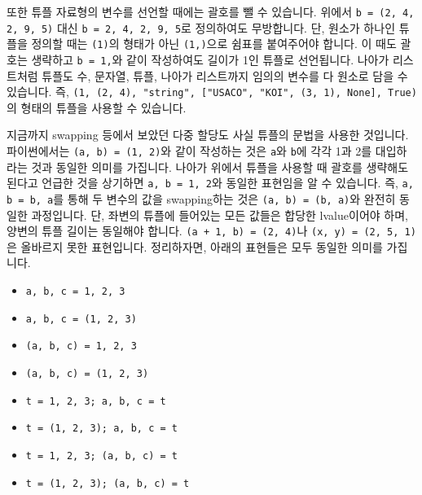 \documentclass[../main.tex]{subfiles}
\begin{document}
또한 튜플 자료형의 변수를 선언할 때에는 괄호를 뺄 수 있습니다.
위에서 \texttt{b = (2, 4, 2, 9, 5)} 대신 \texttt{b = 2, 4, 2, 9, 5}로 정의하여도 무방합니다.
단, 원소가 하나인 튜플을 정의할 때는 \texttt{(1)}의 형태가 아닌 \texttt{(1,)}으로 쉼표를 붙여주어야 합니다.
이 때도 괄호는 생략하고 \texttt{b = 1,}와 같이 작성하여도 길이가 1인 튜플로 선언됩니다.
나아가 리스트처럼 튜플도 수, 문자열, 튜플, 나아가 리스트까지 임의의 변수를 다 원소로 담을 수 있습니다.
즉, \texttt{(1, (2, 4), "string", ["USACO", "KOI", (3, 1), None], True)}의 형태의 튜플을 사용할 수 있습니다.

지금까지 swapping 등에서 보았던 다중 할당도 사실 튜플의 문법을 사용한 것입니다.
파이썬에서는 \texttt{(a, b) = (1, 2)}와 같이 작성하는 것은 \texttt{a}와 \texttt{b}에 각각 1과 2를 대입하라는 것과 동일한 의미를 가집니다.
나아가 위에서 튜플을 사용할 때 괄호를 생략해도 된다고 언급한 것을 상기하면 \texttt{a, b = 1, 2}와 동일한 표현임을 알 수 있습니다.
즉, \texttt{a, b = b, a}를 통해 두 변수의 값을 swapping하는 것은 \texttt{(a, b) = (b, a)}와 완전히 동일한 과정입니다.
단, 좌변의 튜플에 들어있는 모든 값들은 합당한 lvalue이어야 하며, 양변의 튜플 길이는 동일해야 합니다.
\texttt{(a + 1, b) = (2, 4)}나 \texttt{(x, y) = (2, 5, 1)}은 올바르지 못한 표현입니다.
정리하자면, 아래의 표현들은 모두 동일한 의미를 가집니다.
\begin{itemize}
	\item \texttt{a, b, c = 1, 2, 3}
	\item \texttt{a, b, c = (1, 2, 3)}
	\item \texttt{(a, b, c) = 1, 2, 3}
	\item \texttt{(a, b, c) = (1, 2, 3)}
	\item \texttt{t = 1, 2, 3; a, b, c = t}
	\item \texttt{t = (1, 2, 3); a, b, c = t}
	\item \texttt{t = 1, 2, 3; (a, b, c) = t}
	\item \texttt{t = (1, 2, 3); (a, b, c) = t}
\end{itemize}
\end{document}
